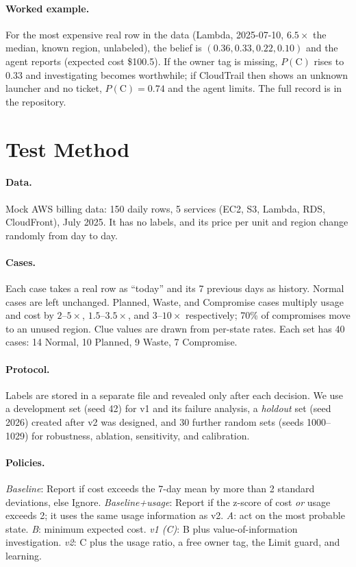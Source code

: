 \documentclass{article}
\newcommand{\Pc}{P(\mathrm{C})}
\begin{document}
\paragraph{Worked example.} For the most expensive real row in the data (Lambda, 2025-07-10, $6.5\times$ the median, known region, unlabeled), the belief is $(0.36, 0.33, 0.22, 0.10)$ and the agent reports (expected cost \$100.5). If the owner tag is missing, $\Pc$ rises to 0.33 and investigating becomes worthwhile; if CloudTrail then shows an unknown launcher and no ticket, $\Pc = 0.74$ and the agent limits. The full record is in the repository.

\section{Test Method}

\paragraph{Data.} Mock AWS billing data: 150 daily rows, 5 services (EC2, S3, Lambda, RDS, CloudFront), July 2025. It has no labels, and its price per unit and region change randomly from day to day.

\paragraph{Cases.} Each case takes a real row as ``today'' and its 7 previous days as history. Normal cases are left unchanged. Planned, Waste, and Compromise cases multiply usage and cost by $2$--$5\times$, $1.5$--$3.5\times$, and $3$--$10\times$ respectively; 70\% of compromises move to an unused region. Clue values are drawn from per-state rates. Each set has 40 cases: 14 Normal, 10 Planned, 9 Waste, 7 Compromise.

\paragraph{Protocol.} Labels are stored in a separate file and revealed only after each decision. We use a development set (seed 42) for v1 and its failure analysis, a \emph{holdout} set (seed 2026) created after v2 was designed, and 30 further random sets (seeds 1000--1029) for robustness, ablation, sensitivity, and calibration.

\paragraph{Policies.} \emph{Baseline}: Report if cost exceeds the 7-day mean by more than 2 standard deviations, else Ignore. \emph{Baseline+usage}: Report if the z-score of cost \emph{or} usage exceeds 2; it uses the same usage information as v2. \emph{A}: act on the most probable state. \emph{B}: minimum expected cost. \emph{v1 (C)}: B plus value-of-information investigation. \emph{v2}: C plus the usage ratio, a free owner tag, the Limit guard, and learning.
\end{document}
